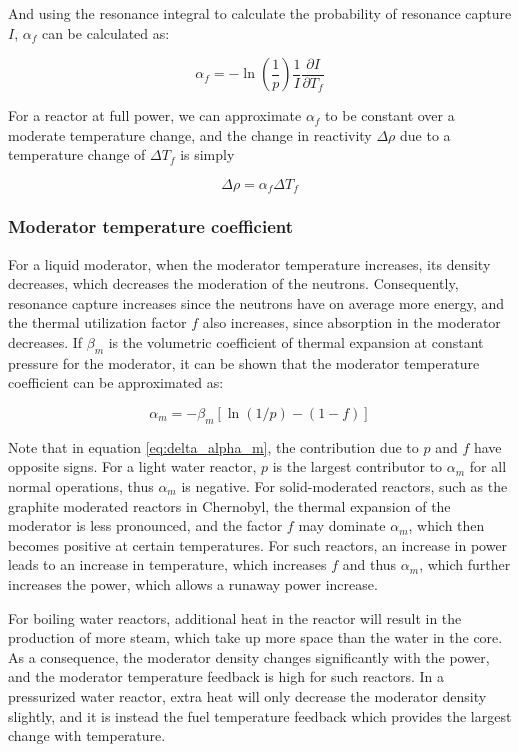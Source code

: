 And using the resonance integral to calculate the probability of resonance capture $I$, $\alpha_f$ can be calculated as:

\begin{equation} \label{eq:alpha_f_I}
\alpha_f = - \ln \left(\frac{1}{p}\right)\frac{1}{I}\frac{\partial I}{\partial T_f}
\end{equation} 

For a reactor at full power, we can approximate $\alpha_f$ to be constant over a moderate temperature change, and the change in reactivity $\Delta \rho$ due to a temperature change of $\Delta T_f$ is simply

\begin{equation} \label{eq:delta_alpha_f}
\Delta \rho = \alpha_f \Delta T_f
\end{equation} 

\subsubsection{Moderator temperature coefficient}
For a liquid moderator, when the moderator temperature increases, its density decreases, which decreases the moderation of the neutrons. Consequently, resonance capture increases since the neutrons have on average more energy, and the thermal utilization factor $f$ also increases, since absorption in the moderator decreases. If $\beta_m$ is the volumetric coefficient of thermal expansion at constant pressure for the moderator, it can be shown that the moderator temperature coefficient can be approximated as:

\begin{equation} \label{eq:delta_alpha_m}
\alpha_m = -\beta_m [\ln(1/p) - (1-f)]
\end{equation}

Note that in equation \ref{eq:delta_alpha_m}, the contribution due to $p$ and $f$ have opposite signs. For a light water reactor, $p$ is the largest contributor to $\alpha_m$ for all normal operations, thus $\alpha_m$ is  negative. For solid-moderated reactors, such as the graphite moderated reactors in Chernobyl, the thermal expansion of the moderator is less pronounced, and the factor $f$ may dominate $\alpha_m$, which then becomes positive at certain temperatures. For such reactors, an increase in power leads to an increase in temperature, which increases $f$ and thus $\alpha_m$, which further increases the power, which allows a runaway power increase. 

For boiling water reactors, additional heat in the reactor will result in the production of more steam, which take up more space than the water in the core. As a consequence, the moderator density changes significantly with the power, and the moderator temperature feedback is high for such reactors. In a pressurized water reactor, extra heat will only decrease the moderator density slightly, and it is instead the fuel temperature feedback which provides the largest change with temperature. 

